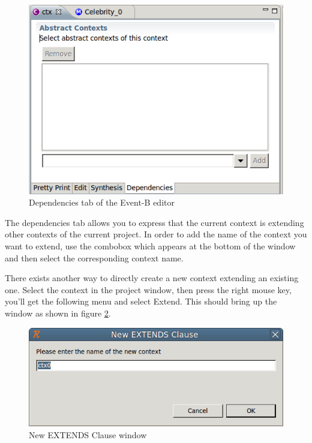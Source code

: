 \begin{figure}[!h]
\begin{center}
	\includegraphics{img/reference/ref_01_eventb_editor8.png}
	\caption{Dependencies tab of the Event-B editor}
	\label{fig_ref_01_eventb_editor8}
\end{center}
\end{figure}

The dependencies tab allows you to express that the current context is extending other contexts of the current project. In order to add the name of the context you want to extend, use the combobox which appears at the bottom of the window and then select the corresponding context name.

There exists another way to directly create a new context extending an existing one. Select the context in the project window, then press the right mouse key, you’ll get the following menu and select \textsf{Extend}. This should bring up the window as shown in figure \ref{fig_ref_01_eventb_editor9}.

\begin{figure}[!h]
\begin{center}
	\includegraphics{img/reference/ref_01_eventb_editor9.png}
	\caption{New EXTENDS Clause window}
	\label{fig_ref_01_eventb_editor9}
\end{center}
\end{figure}

